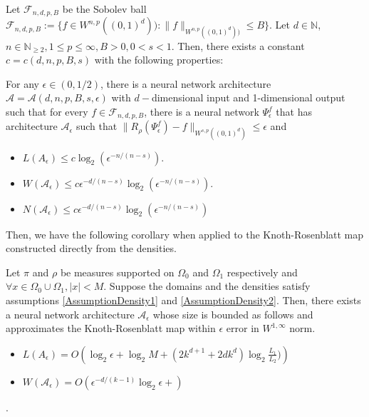 \begin{theorem}\label{thm:NNApproximation}
Let $\mathcal{F}_{n, d, p, B}$ be the Sobolev ball $\mathcal{F}_{n, d, p, B} := \{f\in W^{n, p}((0,1)^d)): \|f\|_{W^{n, p}((0,1)^d))} \leq B\}$. Let $d \in \mathbb{N}$, $n\in\mathbb{N}_{\geq 2}, 1 \leq p \leq \infty, B > 0, 0 < s < 1$. Then, there exists a constant $c = c(d, n, p, B, s)$ with the following properties:

For any $\epsilon \in (0, 1/2)$, there is a neural network architecture $\mathcal{A} = \mathcal{A}(d, n, p, B, s, \epsilon)$ with $d-$dimensional input and 1-dimensional output such that for every $f\in \mathcal{F}_{n, d, p, B}$, there is a neural network $\Psi_\epsilon^f$ that has architecture $\mathcal{A}_\epsilon$ such that 
$\|R_\rho(\Psi_\epsilon^f) - f\|_{W^{s,p}((0,1)^d)}\leq \epsilon$ and
\begin{itemize}
    \item $L(A_\epsilon) \leq c\log_2(\epsilon^{-n/(n-s)})$.
    \item $W(\mathcal{A}_\epsilon) \leq c\epsilon^{-d/(n-s)}\log_2(\epsilon^{-n/(n-s)})$.
    \item $N(\mathcal{A}_\epsilon) \leq c\epsilon^{-d/(n-s)}\log_2(\epsilon^{-n/(n-s)})$
\end{itemize}

\end{theorem}
Then, we have the following corollary when applied to the Knoth-Rosenblatt map constructed directly from the densities. 
\begin{corollary}\label{corollary:NetParameterBound}
Let $\pi$ and $\rho$ be measures supported on $\Omega_0$ and $\Omega_1$ respectively and $\forall x \in \Omega_0\cup\Omega_1, |x| < M$. Suppose the domains and the densities satisfy assumptions \ref{AssumptionDensity1} and \ref{AssumptionDensity2}. Then, there exists a neural network architecture $\mathcal{A}_{\epsilon}$ whose size is bounded as follows and approximates the Knoth-Rosenblatt map within $\epsilon$ error in $W^{1,\infty}$ norm.
\begin{itemize}
    \item $L(A_\epsilon) = O\left(\log_2\epsilon + \log_2M + (2k^{d+1}+2dk^d)\log_2\frac{L_1}{L_2}) \right)$
    \item $W(\mathcal{A}_\epsilon) = O(\epsilon^{-d/(k-1)}\log_2\epsilon + )$
    
    
\end{itemize}
\end{corollary}
. 
